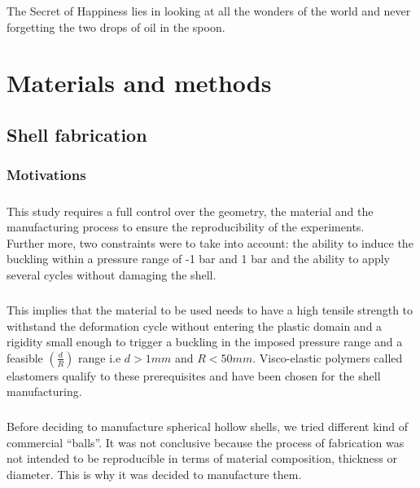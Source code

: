 \begin{savequote}
The Secret of Happiness lies in looking at all the wonders of the world and never forgetting the two drops of oil in the spoon.
\end{savequote}

\chapter{Materials and methods}

\section{Shell fabrication}
\subsection{Motivations}
\paragraph{}
This study requires a full control over the geometry, the material and the manufacturing process to ensure the reproducibility of the experiments.\\
Further more, two constraints were to take into account: the ability to induce the buckling within a pressure range of -1 bar and 1 bar and the ability to apply several cycles without damaging the shell. 
\paragraph{}This implies that the material to be used needs to have a high tensile strength to withstand the deformation cycle without entering the plastic domain and a rigidity small enough to trigger a buckling in the imposed pressure range and a feasible $(\frac{d}{R})$ range i.e $d > 1 mm$ and $R < 50 mm$. Visco-elastic polymers called elastomers qualify to these prerequisites and have been chosen for the shell manufacturing.
\paragraph{}
Before deciding to manufacture spherical hollow shells, we tried different kind of commercial "`balls"'. It was not conclusive because the process of fabrication was not intended to be reproducible in terms of material composition, thickness or diameter. This is why it was decided to manufacture them.

